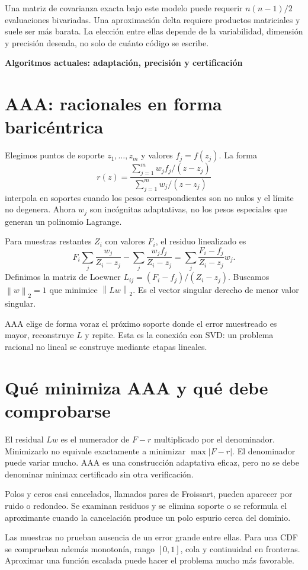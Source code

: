 \documentclass[11pt,a4paper]{article}
\newcommand{\norm}[1]{\left\lVert #1\right\rVert}
\theoremstyle{definition}
\newcommand{\parte}[1]{\par\bigskip\Needspace{8\baselineskip}\begin{center}{\Large\bfseries\color{azul}#1}\end{center}}
\newcounter{problema}
\begin{document}
Una matriz de covarianza exacta bajo este modelo puede requerir $n(n-1)/2$ evaluaciones bivariadas.
Una aproximación delta requiere productos matriciales y suele ser más barata.
La elección entre ellas depende de la variabilidad, dimensión y precisión deseada, no solo de cuánto código se escribe.



\parte{Algoritmos actuales: adaptación, precisión y certificación}
\section{AAA: racionales en forma baricéntrica}
Elegimos puntos de soporte $z_1,\ldots,z_m$ y valores $f_j=f(z_j)$. La forma
\[
r(z)=\frac{\sum_{j=1}^m w_jf_j/(z-z_j)}
{\sum_{j=1}^m w_j/(z-z_j)}
\]
interpola en soportes cuando los pesos correspondientes son no nulos y el límite no degenera. Ahora $w_j$ son incógnitas adaptativas, no los pesos especiales que generan un polinomio Lagrange.

Para muestras restantes $Z_i$ con valores $F_i$, el residuo linealizado es
\[
F_i\sum_j\frac{w_j}{Z_i-z_j}
-\sum_j\frac{w_jf_j}{Z_i-z_j}
=\sum_j\frac{F_i-f_j}{Z_i-z_j}w_j.
\]
Definimos la matriz de Loewner
$L_{ij}=(F_i-f_j)/(Z_i-z_j)$. Buscamos $\norm w_2=1$ que minimice $\norm{Lw}_2$. Es el vector singular derecho de menor valor singular.

AAA elige de forma voraz el próximo soporte donde el error muestreado es mayor, reconstruye $L$ y repite. Esta es la conexión con SVD: un problema racional no lineal se construye mediante etapas lineales.

\section{Qué minimiza AAA y qué debe comprobarse}
El residual $Lw$ es el numerador de $F-r$ multiplicado por el denominador. Minimizarlo no equivale exactamente a minimizar $\max|F-r|$. El denominador puede variar mucho. AAA es una construcción adaptativa eficaz, pero no se debe denominar minimax certificado sin otra verificación.

Polos y ceros casi cancelados, llamados pares de Froissart, pueden aparecer por ruido o redondeo. Se examinan residuos y se elimina soporte o se reformula el aproximante cuando la cancelación produce un polo espurio cerca del dominio.

Las muestras no prueban ausencia de un error grande entre ellas. Para una CDF se comprueban además monotonía, rango $[0,1]$, cola y continuidad en fronteras. Aproximar una función escalada puede hacer el problema mucho más favorable.
\end{document}
